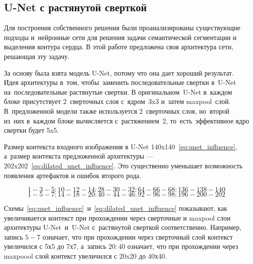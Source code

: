 \subsection{U-Net с растянутой сверткой}

Для построения собственного решения были проанализированы существующие подходы 
и~нейронные сети для решения задачи семантической сегментации и выделения контура сердца. 
В этой работе предложена своя архитектура сети, решающая эту задачу.

За основу была взята модель U-Net, потому что она дает хороший результат. 
Идея архитектуры в~том, чтобы~заменить последовательные свертки в~U-Net 
на~последовательные растянутые свертки. В оригинальном~U-Net в~каждом блоке 
присутствует 2~сверточных слоя с~ядром~3x3 и~затем maxpool~слой. В~предложенной 
модели также используется 2~сверточных слоя, но~второй из~них в~каждом блоке 
вычисляется с~растяжением~2, то~есть~эффективное ядро свертки будет 5x5. 

\newpage

Размер контекста входного изображения в U-Net 140x140~\eqref{eq:unet_influence}, а~размер контекста предложенной архитектуры — 202x202~\eqref{eq:dilated_unet_influence}. Это существенно уменьшает возможность появления артефактов и ошибок второго рода.

\begin{equation} 
\label{eq:unet_influence}
1-3-5:10-12-14:28-30-32:64-66-68:136-138-140
\end{equation}
\begin{equation} 
\label{eq:dilated_unet_influence}
1-5-7:14-18-20:40-44-46:92-96-98:196-200-202
\end{equation}

Схемы~\eqref{eq:unet_influence}~и~\eqref{eq:dilated_unet_influence} показывают, как увеличивается контекст при прохождении через сверточные и maxpool слои архитектуры U-Net~и~U-Net с~растянутой сверткой соответственно. Например, запись $5-7$ означает, что при прохождении через сверточный слой контекст увеличился с 5х5 до 7х7, а~запись $20:40$ означает, что при прохождении через maxpoool слой контекст увеличился с 20x20 до 40х40.
